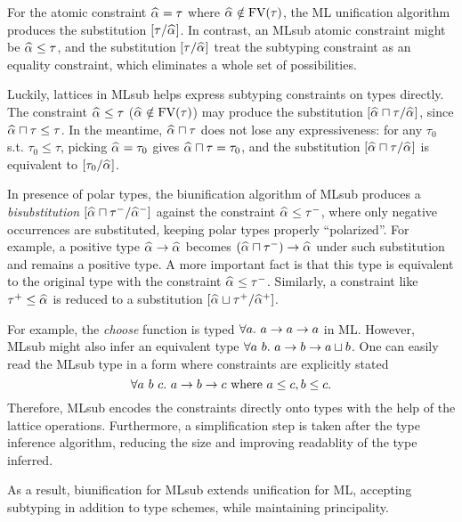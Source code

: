 For the atomic constraint $\al = \tau$ where $\al \notin \text{FV}(\tau)$,
the ML unification algorithm produces the substitution $[\tau/\al]$.
In contrast, an MLsub atomic constraint might be $\al \le \tau$,
and the substitution $[\tau/\al]$ treat the subtyping constraint as an equality constraint,
which eliminates a whole set of possibilities.

Luckily, lattices in MLsub helps express subtyping constraints on types directly.
The constraint $\al \le \tau$ ($\al \notin \text{FV}(\tau)$) may produce the substitution
$[\al \sqcap \tau/\al]$, since $\al \sqcap \tau \le \tau$.
In the meantime, $\al \sqcap \tau$ does not lose any expressiveness:
for any $\tau_0$ s.t. $\tau_0 \le \tau$,
picking $\al = \tau_0$ gives $\al \sqcap \tau = \tau_0$,
and the substitution $[\al \sqcap \tau/\al]$ is equivalent to $[\tau_0/\al]$.

In presence of polar types, the biunification algorithm of MLsub
produces a \emph{bisubstitution} $[\al \sqcap \tau^-/\al^-]$
against the constraint $\al \le \tau^-$,
where only negative occurrences are substituted,
keeping polar types properly ``polarized''.
For example, a positive type $\al \to \al$ becomes $(\al \sqcap \tau^-) \to \al$
under such substitution and remains a positive type.
A more important fact is that this type is equivalent to
the original type with the constraint $\al \le \tau^-$.
Similarly, a constraint like $\tau^+ \le \al$ is reduced to
a substitution $[\al \sqcup \tau^+/\al^+]$.

For example, the \emph{choose} function is typed $\all a \to a \to a$ in ML.
However, MLsub might also infer an equivalent type
$\all[a~b] a \to b \to a \sqcup b$.
One can easily read the MLsub type in a form
where constraints are explicitly stated
\[\all[a~b~c] a \to b \to c \text{ where } a \le c, b \le c.\]
Therefore, MLsub encodes the constraints directly onto types with the help of
the lattice operations.
Furthermore, a simplification step is taken after the type inference algorithm,
reducing the size and improving readablity of the type inferred.

As a result, biunification for MLsub extends unification for ML,
accepting subtyping in addition to type schemes,
while maintaining principality.


